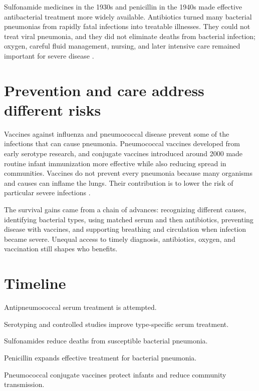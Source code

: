 \documentclass[12pt,oneside]{book}
\begin{document}
Sulfonamide medicines in the 1930s and penicillin in the 1940s made effective
antibacterial treatment more widely available. Antibiotics turned many
bacterial pneumonias from rapidly fatal infections into treatable illnesses.
They could not treat viral pneumonia, and they did not eliminate deaths from
bacterial infection; oxygen, careful fluid management, nursing, and later
intensive care remained important for severe disease \cite{pneumoniaHistory}.

\section{Prevention and care address different risks}
Vaccines against influenza and pneumococcal disease prevent some of the
infections that can cause pneumonia. Pneumococcal vaccines developed from
early serotype research, and conjugate vaccines introduced around 2000 made
routine infant immunization more effective while also reducing spread in
communities. Vaccines do not prevent every pneumonia because many organisms
and causes can inflame the lungs. Their contribution is to lower the risk of
particular severe infections \cite{pneumoniaHistory}.

The survival gains came from a chain of advances: recognizing different
causes, identifying bacterial types, using matched serum and then antibiotics,
preventing disease with vaccines, and supporting breathing and circulation
when infection became severe. Unequal access to timely diagnosis, antibiotics,
oxygen, and vaccination still shapes who benefits.

\section*{Timeline}
\begin{description}[leftmargin=2.3cm,style=nextline]
  \item[1890s] Antipneumococcal serum treatment is attempted.
  \item[1910s--1920s] Serotyping and controlled studies improve type-specific serum treatment.
  \item[1930s] Sulfonamides reduce deaths from susceptible bacterial pneumonia.
  \item[1940s] Penicillin expands effective treatment for bacterial pneumonia.
  \item[2000 onward] Pneumococcal conjugate vaccines protect infants and reduce community transmission.
\end{description}
\end{document}
